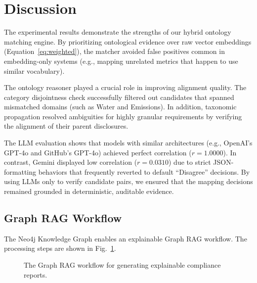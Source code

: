 \documentclass[journal,compsoc]{IEEEtran}
\begin{document}
\begin{table}[t]
\section{Discussion}
The experimental results demonstrate the strengths of our hybrid ontology matching engine. By prioritizing ontological evidence over raw vector embeddings (Equation~\ref{eq:weighted}), the matcher avoided false positives common in embedding-only systems (e.g., mapping unrelated metrics that happen to use similar vocabulary). 

The ontology reasoner played a crucial role in improving alignment quality. The category disjointness check successfully filtered out candidates that spanned mismatched domains (such as Water and Emissions). In addition, taxonomic propagation resolved ambiguities for highly granular requirements by verifying the alignment of their parent disclosures.

The LLM evaluation shows that models with similar architectures (e.g., OpenAI's GPT-4o and GitHub's GPT-4o) achieved perfect correlation ($r = 1.0000$). In contrast, Gemini displayed low correlation ($r = 0.0310$) due to strict JSON-formatting behaviors that frequently reverted to default ``Disagree'' decisions. By using LLMs only to verify candidate pairs, we ensured that the mapping decisions remained grounded in deterministic, auditable evidence.

\subsection{Graph RAG Workflow}
The Neo4j Knowledge Graph enables an explainable Graph RAG workflow. The processing steps are shown in Fig.~\ref{fig:rag_work}.

\begin{figure}[h]
\centering
{}
\caption{The Graph RAG workflow for generating explainable compliance reports.}
\label{fig:rag_work}
\end{figure}


\end{table}
\end{document}
